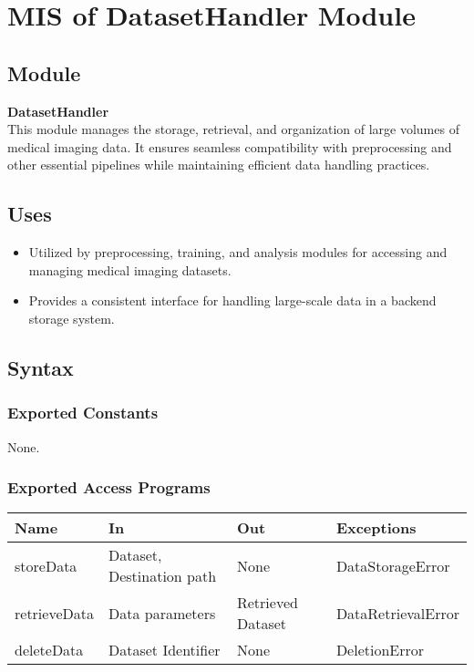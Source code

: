 \documentclass[12pt, titlepage]{article}
\begin{document}
\section{MIS of DatasetHandler Module} \label{mDatasetHandler}

\subsection{Module}
\textbf{DatasetHandler} \\
This module manages the storage, retrieval, and organization of large volumes of medical imaging data. It ensures seamless compatibility with preprocessing and other essential pipelines while maintaining efficient data handling practices.

\subsection{Uses}
\begin{itemize}
    \item Utilized by preprocessing, training, and analysis modules for accessing and managing medical imaging datasets.
    \item Provides a consistent interface for handling large-scale data in a backend storage system.
\end{itemize}

\subsection{Syntax}

\subsubsection{Exported Constants}
None.

\subsubsection{Exported Access Programs}

\begin{center}
  \begin{tabular}{p{3cm} p{4cm} p{4cm} p{5cm}}
    \hline
    \textbf{Name} & \textbf{In} & \textbf{Out} & \textbf{Exceptions} \\
    \hline
    storeData & Dataset, Destination path & None & DataStorageError \\
    \hline
    retrieveData & Data parameters & Retrieved Dataset & DataRetrievalError \\
    \hline
    deleteData & Dataset Identifier & None & DeletionError \\
    \hline
  \end{tabular}
\end{center}
\end{document}
